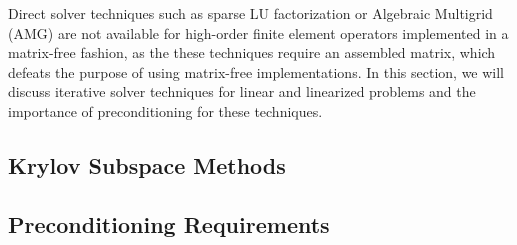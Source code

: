 Direct solver techniques such as sparse LU factorization or Algebraic Multigrid (AMG) are not available for high-order finite element operators implemented in a matrix-free fashion, as the these techniques require an assembled matrix, which defeats the purpose of using matrix-free implementations.
In this section, we will discuss iterative solver techniques for linear and linearized problems and the importance of preconditioning for these techniques.

\subsection{Krylov Subspace Methods}


\subsection{Preconditioning Requirements}
